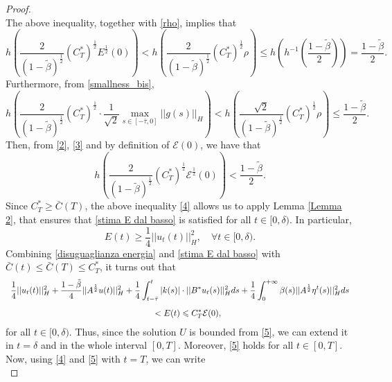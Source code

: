 \documentclass[11pt]{article}
\renewcommand{\geq}{\geqslant}
\renewcommand{\leq}{\leqslant}
\renewcommand{\le}{\leqslant}
\begin{document}
\begin{proof}
$$$$
The above inequality, together with \eqref{rho}, implies that
\begin{equation}\label{2}
	h\left(\frac{2}{(1-\tilde{\beta})^{\frac{1}{2}}}(C_T^*)^{\frac{1}{2}}E^{\frac{1}{2}}(0)\right)<h\left(\frac{2}{(1-\tilde{\beta})^{\frac{1}{2}}}(C_T^*)^{\frac{1}{2}}\rho\right)\leq h\left(h^{-1}\left(\frac{1-\tilde\beta}{2}\right)\right)=\frac{1-\tilde\beta}{2}.
\end{equation}
Furthermore, from \eqref{smallness_bis}, 
\begin{equation}\label{3}
	h\left(\frac{2}{(1-\tilde{\beta})^{\frac{1}{2}}}(C_T^*)^{\frac{1}{2}}\cdot\frac{1}{\sqrt{2}}\max_{s\in [-\bar{\tau},0]}||g(s)||_{H}\right)< h\left(\frac{\sqrt{2}}{(1-\tilde{\beta})^{\frac{1}{2}}}(C_T^*)^{\frac{1}{2}}\rho\right)\le \frac{1-\tilde\beta}{2}.
\end{equation}
Then, from \eqref{2}, \eqref{3} and by definition of $\mathcal{E}(0)$, we have that
\begin{equation}\label{4}
h\left(\frac{2}{(1-\tilde{\beta})^{\frac{1}{2}}}(C_T^*)^{\frac{1}{2}}\mathcal{E}^{\frac{1}{2}}(0)\right)<\frac{1-\tilde{\beta}}{2}.
\end{equation}
Since $C_T^*\geq \bar{C}(T)$, the above inequality \eqref{4} allows us to apply Lemma \ref{Lemma 2}, that ensures that \eqref{stima E dal basso} is satisfied for all $t\in [0,\delta)$. In particular,
$$E(t)\geq \frac{1}{4}||u_t(t)||_{H}^2,\quad \forall t\in [0,\delta).$$
Combining \eqref{disuguaglianza energia} and \eqref{stima E dal basso} with $\bar{C}(t)\leq \bar{C}(T)\leq C_T^*$, it turns out that
\begin{equation}\label{5}
	\begin{array}{l}
		\vspace{0.3cm}\displaystyle{\frac{1}{4}||u_t(t)||_H^2+\frac{1-\tilde{\beta}}{4}||A^\frac{1}{2}u(t)||_H^2+\frac{1}{4}\int_{t-\bar\tau}^t |k(s)| \cdot ||B^*u_t(s)||_H^2 ds
			+\frac{1}{4}\int_0^{+\infty} \beta(s) ||A^\frac{1}{2}\eta^t (s)||_H^2 ds}\\
		\displaystyle{\hspace{6cm}<E(t)\leq C_T^*\mathcal E(0),}
\end{array}
 \end{equation}
for all $t\in [0,\delta)$. Thus, since the solution $U$ is bounded from \eqref{5}, we can extend it in $t=\delta$ and in the whole interval $[0,T]$. Moreover, \eqref{5} holds for all $t\in [0,T]$.
\\Now, using \eqref{4} and \eqref{5} with $t=T$, we can write
\begin{equation}\label{t=T}

\end{equation}
\end{proof}
\end{document}
